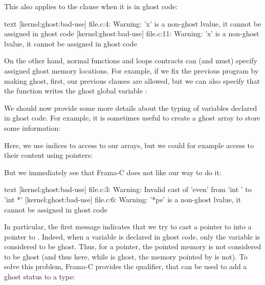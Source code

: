This also applies to the  clause when it is
in ghost code:




\begin{CodeBlock}{text}
[kernel:ghost:bad-use] file.c:4: Warning:
  'x' is a non-ghost lvalue, it cannot be assigned in ghost code
[kernel:ghost:bad-use] file.c:11: Warning:
  'x' is a non-ghost lvalue, it cannot be assigned in ghost code
\end{CodeBlock}


On the other hand, normal functions and loops contracts can (and
must) specify assigned ghost memory locations. For example, if we
fix the previous program by making  ghost, first, our
previous  clauses are allowed, but we can also
specify that the function  writes the ghost global
variable :






We should now provide some more details about the typing of variables
declared in ghost code. For example, it is sometimes useful to create
a ghost array to store some information:




Here, we use indices to access to our arrays, but we could for example
access to their content using pointers:




But we immediately see that Frama-C does not like our way to do it:


\begin{CodeBlock}{text}
[kernel:ghost:bad-use] file.c:3: Warning:
  Invalid cast of 'even' from 'int \ghost *' to 'int *'
[kernel:ghost:bad-use] file.c:6: Warning:
  '*pe' is a non-ghost lvalue, it cannot be assigned in ghost code
\end{CodeBlock}


In particular, the first message indicates that we try to cast
a pointer to  into a pointer
to . Indeed, when a variable is declared in ghost
code, only the variable is considered to be ghost. Thus, for a pointer,
the pointed memory is not considered to be ghost (and thus here, while
 is ghost, the memory pointed by  is
not). To solve this problem, Frama-C provides the
 qualifier, that can be used to
add a ghost status to a type:


